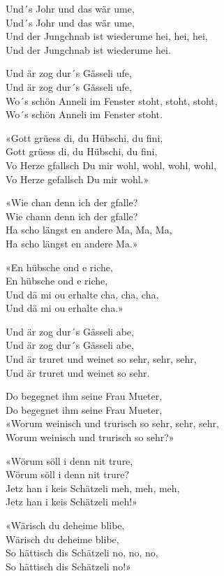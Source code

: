 \documentclass[
  letterpaper,
  twoside=false]{scrbook}
\begin{document}
Und´s Johr und das wär ume,\\
Und´s Johr und das wär ume,\\
Und der Jungchnab ist wiederume hei, hei, hei,\\
Und der Jungchnab ist wiederume hei.

Und är zog dur´s Gässeli ufe,\\
Und är zog dur´s Gässeli ufe,\\
Wo´s schön Anneli im Fenster stoht, stoht, stoht,\\
Wo´s schön Anneli im Fenster stoht.

«Gott grüess di, du Hübschi, du fini,\\
Gott grüess di, du Hübschi, du fini,\\
Vo Herze gfallsch Du mir wohl, wohl, wohl, wohl,\\
Vo Herze gefallsch Du mir wohl.»

«Wie chan denn ich der gfalle?\\
Wie chann denn ich der gfalle?\\
Ha scho längst en andere Ma, Ma, Ma,\\
Ha scho längst en andere Ma.»

«En hübsche ond e riche,\\
En hübsche ond e riche,\\
Und dä mi ou erhalte cha, cha, cha,\\
Und dä mi ou erhalte cha.»

Und är zog dur´s Gässeli abe,\\
Und är zog dur´s Gässeli abe,\\
Und är truret und weinet so sehr, sehr, sehr,\\
Und är truret und weinet so sehr.

Do begegnet ihm seine Frau Mueter,\\
Do begegnet ihm seine Frau Mueter,\\
«Worum weinisch und trurisch so sehr, sehr, sehr,\\
Worum weinisch und trurisch so sehr?»

«Wörum söll i denn nit trure,\\
Wörum söll i denn nit trure?\\
Jetz han i keis Schätzeli meh, meh, meh,\\
Jetz han i keis Schätzeli meh!»

«Wärisch du deheime blibe,\\
Wärisch du deheime blibe,\\
So hättisch dis Schätzeli no, no, no,\\
So hättisch dis Schätzeli no!»
\end{document}
